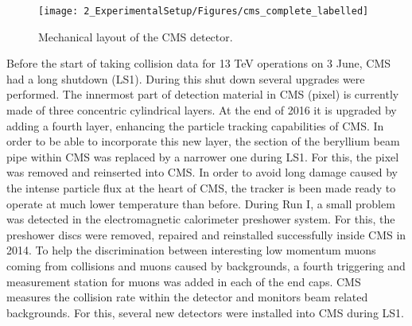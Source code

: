 \begin{figure}[ht]
	\centering
	\texttt{[image: 2\_ExperimentalSetup/Figures/cms\_complete\_labelled]}
	\caption{Mechanical layout of the CMS detector\cite{CMSdraw}.}
	\label{fig:CMS}
\end{figure}

Before the start of taking collision data for 13 \si{ \TeV} operations on 3 June, CMS had a long shutdown (LS1)\cite{Pralavorio:2024977}. During this shut down several upgrades were performed. The innermost part of detection material in CMS (pixel) is currently made of three concentric cylindrical layers. At the end of 2016 it is upgraded by adding a fourth layer, enhancing the particle tracking capabilities of CMS. In order to be able to incorporate this new layer, the section of the beryllium beam pipe within CMS was replaced by a narrower one during LS1. For this, the pixel was removed and reinserted into CMS.  In order to avoid long damage caused by the intense particle flux at the heart of CMS, the tracker is been made ready to operate at much lower temperature than before. During Run I, a small problem was detected in the electromagnetic calorimeter preshower system. For this, the preshower discs were removed, repaired and reinstalled successfully inside CMS in 2014. To help the discrimination between interesting low momentum muons coming from collisions and muons caused by backgrounds, a fourth triggering and measurement station for muons was added in each of the end caps.  CMS measures the collision rate within the detector and monitors beam related backgrounds. For this, several new detectors were installed into CMS during LS1. 


\newpage
